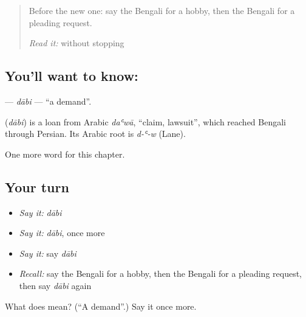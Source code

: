 \label{lesson:BN-C97-dabi}



\begin{quote}
Before the new one: say the Bengali for a hobby, then the Bengali for a pleading request.

\emph{Read it:} \textbf{    } without stopping
\end{quote}

\subsection*{You'll want to know: }
\textbf{} — \emph{dābi} — \textquotedblleft{}a demand\textquotedblright{}.

\begin{cousinweb}
\textbf{} (\emph{dābi}) is a loan from Arabic \emph{daʿwā}, \textquotedblleft{}claim, lawsuit\textquotedblright{}, which reached Bengali through Persian. Its Arabic root is \emph{d-ʿ-w} (Lane).
\end{cousinweb}

\begin{grammarlens}[title={What you've built}]
One more word for this chapter.
\end{grammarlens}

\subsection*{Your turn}
\begin{itemize}
\raggedright
  \item \emph{Say it:} \emph{dābi}
  \item \emph{Say it:} \emph{dābi}, once more
  \item \emph{Say it:} say \emph{dābi}
  \item \emph{Recall:} say the Bengali for a hobby, then the Bengali for a pleading request, then say \emph{dābi} again
\end{itemize}

\begin{tcolorbox}[breakable,colback=teal!4,colframe=teal!35!black,title={Before you move on}]
What does  mean? (\textquotedblleft{}A demand\textquotedblright{}.) Say it once more.
\end{tcolorbox}
